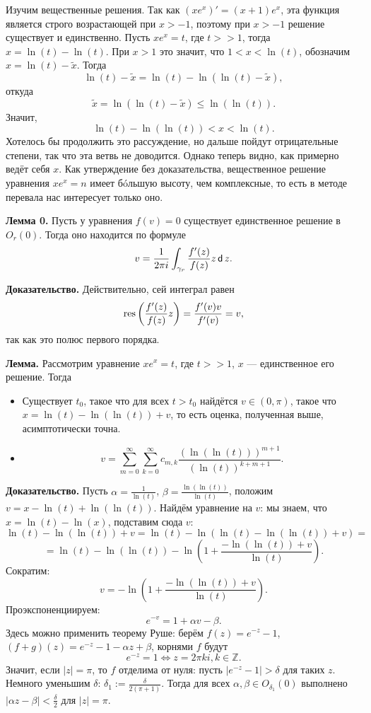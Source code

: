 Изучим вещественные решения.
Так как $(xe^x)' = (x + 1)e^x$, эта функция является строго возрастающей при $x > -1$, поэтому при $x > -1$ решение существует и единственно.
Пусть $x e^x = t$, где $t >> 1$, тогда $x = \ln(t) - \ln(t)$.
При $x > 1$ это значит, что $1 < x < \ln(t)$, обозначим $x = \ln(t) - \tilde x$.
Тогда
\[
    \ln(t) - \tilde x = \ln(t) - \ln(\ln(t) - \tilde x),
\]
откуда
\[
    \tilde x = \ln(\ln(t) - \tilde x) \le \ln(\ln(t)).
\]
Значит,
\[
    \ln(t) - \ln(\ln(t)) < x < \ln(t).
\]
Хотелось бы продолжить это рассуждение, но дальше пойдут отрицательные степени, так что эта ветвь не доводится.
Однако теперь видно, как примерно ведёт себя $x$.
Как утверждение без доказательства, вещественное решение уравнения $xe^x = n$ имеет бóльшую высоту, чем комплексные, то есть в методе перевала нас интересует только оно.

\textbf{Лемма 0.} Пусть у уравнения $f(v) = 0$ существует единственное решение в $O_r(0)$.
Тогда оно находится по формуле
\[
    v = \frac{1}{2\pi i} \int_{\gamma_r} \frac{f'(z)}{f(z)} z \operatorname{\mathsf d} z.
\]

\textbf{Доказательство.} Действительно, сей интеграл равен
\[
    \operatorname{res} \left( \frac{f'(z)}{f(z)} z \right) = \frac{f'(v) v}{f'(v)} = v,
\]
так как это полюс первого порядка.

\QED

\textbf{Лемма.} Рассмотрим уравнение $xe^x = t$, где $t >> 1$, $x$ --- единственное его решение.
Тогда
\begin{itemize}
    \item Существует $t_0$, такое что для всех $t > t_0$ найдётся $v \in (0, \pi)$, такое что $x = \ln(t) - \ln(\ln(t)) + v$, то есть оценка, полученная выше, асимптотически точна.
    \item
        \[
            v = \sum_{m=0}^{\infty} \sum_{k=0}^{\infty} c_{m,k} \frac{(\ln(\ln(t)))^{m+1}}{(\ln(t))^{k+m+1}}.
        \]
\end{itemize}

\textbf{Доказательство.} Пусть $\alpha = \frac{1}{\ln(t)}$, $\beta = \frac{\ln(\ln(t))}{\ln(t)}$, положим $v = x - \ln(t) + \ln(\ln(t))$.
Найдём уравнение на $v$: мы знаем, что $x = \ln(t) - \ln(x)$, подставим сюда $v$:
\[
    \ln(t) - \ln(\ln(t)) + v = \ln(t) - \ln(\ln(t) - \ln(\ln(t)) + v) =
\]
\[
    = \ln(t) - \ln(\ln(t)) - \ln \left( 1 + \frac{-\ln(\ln(t)) + v}{\ln(t)} \right).
\]
Сократим:
\[
    v = -\ln \left(1 + \frac{-\ln(\ln(t)) + v}{\ln(t)} \right).
\]
Проэкспоненциируем:
\[
    e^{-v} = 1 + \alpha v - \beta.
\]
Здесь можно применить теорему Руше: берём $f(z) = e^{-z} - 1$, $(f + g)(z) = e^{-z} - 1 - \alpha z + \beta$, корнями $f$ будут
\[
    e^{-z} = 1 \iff z = 2\pi k i, k \in \mathbb Z.
\]
Значит, если $|z| = \pi$, то $f$ отделима от нуля: пусть $|e^{-z} - 1| > \delta$ для таких $z$.
Немного уменьшим $\delta$: $\delta_1 := \frac{\delta}{2(\pi + 1)}$.
Тогда для всех $\alpha, \beta \in O_{\delta_1}(0)$ выполнено $|\alpha z - \beta| < \frac{\delta}{2}$ для $|z| = \pi$.

